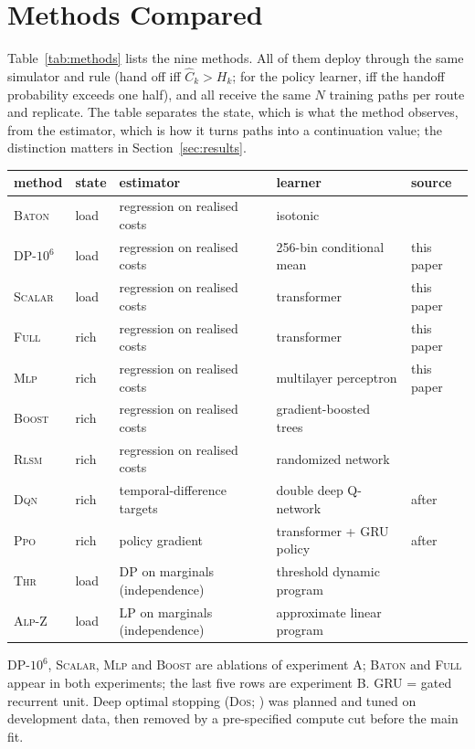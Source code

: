 \documentclass[trsc,dblanonrev]{informs4}
\newcommand{\Full}{\textsc{Full}}
\newcommand{\Scalar}{\textsc{Scalar}}
\newcommand{\Mlp}{\textsc{Mlp}}
\newcommand{\Boost}{\textsc{Boost}}
\newcommand{\Baton}{\textsc{Baton}}
\newcommand{\Thr}{\textsc{Thr}}
\newcommand{\Alpz}{\textsc{Alp-Z}}
\newcommand{\Rlsm}{\textsc{Rlsm}}
\newcommand{\Dqn}{\textsc{Dqn}}
\newcommand{\Ppo}{\textsc{Ppo}}
\newcommand{\Dos}{\textsc{Dos}}
\begin{document}
\section{Methods Compared}\label{sec:arms}

Table~\ref{tab:methods} lists the nine methods. All of them deploy through the
same simulator and rule (hand off iff $\hat C_k > H_k$; for the policy
learner, iff the handoff probability exceeds one half), and all receive the
same $N$ training paths per route and replicate. The table separates the
state, which is what the method observes, from the estimator, which is how it
turns paths into a continuation value; the distinction matters in
Section~\ref{sec:results}.

\begin{table}[t]
{\scriptsize
\begin{tabular}{lllll}
\toprule
method & state & estimator & learner & source \\
\midrule
\Baton{} & load & regression on realised costs & isotonic & \citet{dang2026baton} \\
DP-$10^6$ & load & regression on realised costs & 256-bin conditional mean & this paper \\
\Scalar{} & load & regression on realised costs & transformer & this paper \\
\Full{} & rich & regression on realised costs & transformer & this paper \\
\Mlp{} & rich & regression on realised costs & multilayer perceptron & this paper \\
\Boost{} & rich & regression on realised costs & gradient-boosted trees & \citet{friedman2001greedy} \\
\Rlsm{} & rich & regression on realised costs & randomized network & \citet{herrera2024optimal} \\
\Dqn{} & rich & temporal-difference targets & double deep Q-network & after \citet{dastpak2023offline} \\
\Ppo{} & rich & policy gradient & transformer + GRU policy & after \citet{kadyrov2025drl} \\
\Thr{} & load & DP on marginals (independence) & threshold dynamic program & \citet{yang2000stochastic} \\
\Alpz{} & load & LP on marginals (independence) & approximate linear program & \citet{zhu2026partial} \\
\bottomrule
\end{tabular}}
{DP-$10^6$, \Scalar{}, \Mlp{} and \Boost{} are ablations of experiment A; \Baton{}
and \Full{} appear in both experiments; the last five rows are experiment B.
GRU = gated recurrent unit. Deep optimal stopping (\Dos{};
\citealt{becker2019deep}) was planned and tuned on development data, then
removed by a pre-specified compute cut before the main fit.}
\end{table}
\end{document}
